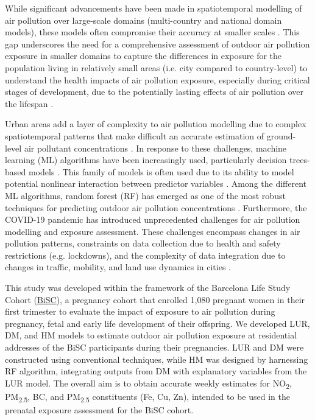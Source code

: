 \documentclass{article}
\begin{document}
While significant advancements have been made in spatiotemporal modelling of air pollution over large-scale domains (multi-country and national domain models), these models often compromise their accuracy at smaller scales \cite{dehoogh2016, chen2019, chen2020, shen2022}. This gap underscores the need for a comprehensive assessment of outdoor air pollution exposure in smaller domains to capture the differences in exposure for the population living in relatively small areas (i.e. city compared to country-level) to understand the health impacts of air pollution exposure, especially during critical stages of development, due to the potentially lasting effects of air pollution over the lifespan \cite{selevan2000, wick2010, ghosh2021}.

Urban areas add a layer of complexity to air pollution modelling due to complex spatiotemporal patterns that make difficult an accurate estimation of ground-level air pollutant concentrations \cite{sokhi2022}. In response to these challenges, machine learning (ML) algorithms have been increasingly used, particularly decision trees-based models \cite{liu2022}. This family of models is often used due to its ability to model potential nonlinear interaction between predictor variables \cite{liu2022treebased}. Among the different ML algorithms, random forest (RF) has emerged as one of the most robust techniques for predicting outdoor air pollution concentrations \cite{chen2019, chen2020, stafoggia2019, stafoggia2020, schneider2020, mila2023}. Furthermore, the COVID-19 pandemic has introduced unprecedented challenges for air pollution modelling and exposure assessment. These challenges encompass changes in air pollution patterns, constraints on data collection due to health and safety restrictions (e.g. lockdowns), and the complexity of data integration due to changes in traffic, mobility, and land use dynamics in cities \cite{gonzalez2022, querol2021}. 
 
This study was developed within the framework of the Barcelona Life Study Cohort (\href{https://projectebisc.org/en/home/}{BiSC}), a pregnancy cohort that enrolled 1,080 pregnant women in their first trimester to evaluate the impact of exposure to air pollution during pregnancy, fetal and early life development of their offspring. We developed LUR, DM, and HM models to estimate outdoor air pollution exposure at residential addresses of the BiSC participants during their pregnancies. LUR and DM were constructed using conventional techniques, while HM was designed by harnessing RF algorithm, integrating outputs from DM with explanatory variables from the LUR model. The overall aim is to obtain accurate weekly estimates for NO\textsubscript{2}, PM\textsubscript{2.5}, BC, and PM\textsubscript{2.5} constituents (Fe, Cu, Zn), intended to be used in the prenatal exposure assessment for the BiSC cohort. 
\end{document}
